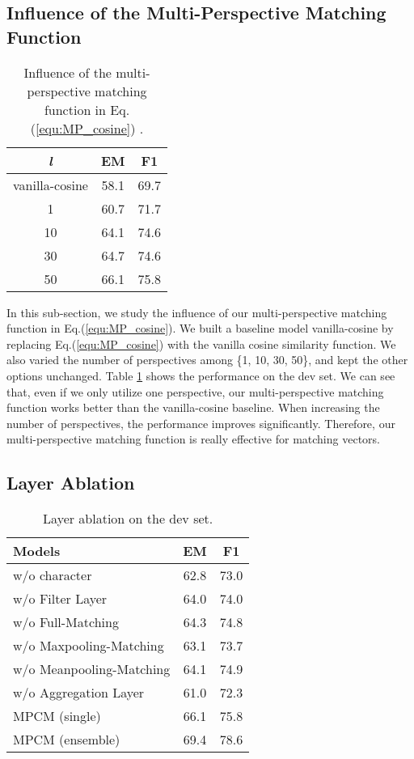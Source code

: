\documentclass[11pt,letterpaper]{article}
\begin{document}
\subsection{Influence of the Multi-Perspective Matching Function}
\begin{table}[tbp]
\centering
\begin{tabular}{ccc}
\toprule
\emph{l} & EM   & F1   \\
\midrule
vanilla-cosine        & 58.1 & 69.7 \\
1                         & 60.7 & 71.7 \\
10                        & 64.1 & 74.6 \\
30                        & 64.7 & 74.6 \\
50                        & 66.1 & 75.8 \\
\bottomrule
\end{tabular}
\caption{Influence of the multi-perspective matching function in Eq.(\ref{equ:MP_cosine}) .}
\label{tab:mp-matching}
\end{table}

In this sub-section, we study the influence of our multi-perspective matching function in Eq.(\ref{equ:MP_cosine}). We built a baseline model vanilla-cosine by replacing Eq.(\ref{equ:MP_cosine}) with the vanilla cosine similarity function. We also varied the number of perspectives  among \{1, 10, 30, 50\}, and kept the other options unchanged. Table \ref{tab:mp-matching} shows the performance on the dev set. We can see that, even if we only utilize one perspective, our multi-perspective matching function works better than the vanilla-cosine baseline. When increasing the number of perspectives, the performance improves significantly. Therefore, our multi-perspective matching function is really effective for matching vectors. 


\subsection{Layer Ablation}
\begin{table}[tbp]
\centering
\begin{tabular}{lcc}
\toprule
Models                   & EM   & F1   \\
\midrule
w/o character       & 62.8 & 73.0 \\
w/o Filter Layer         & 64.0 & 74.0 \\
w/o Full-Matching       & 64.3 & 74.8 \\
w/o Maxpooling-Matching  & 63.1 & 73.7 \\
w/o Meanpooling-Matching & 64.1 & 74.9 \\
w/o Aggregation Layer    & 61.0 & 72.3 \\
\midrule
MPCM (single)            & 66.1 & 75.8 \\
MPCM (ensemble)          & 69.4 & 78.6 \\
\bottomrule
\end{tabular}
\caption{Layer ablation on the dev set.}
\label{tab:ablation}
\end{table}
\end{document}
